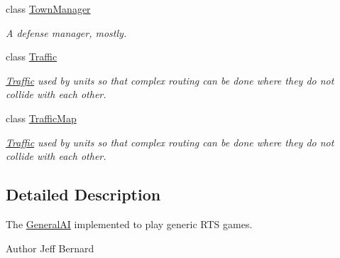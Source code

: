 \begin{DoxyCompactItemize}
class \hyperlink{classai_1_1general_1_1_town_manager}{TownManager}
\begin{DoxyCompactList}\small\item\em A defense manager, mostly. \end{DoxyCompactList}\item 
class \hyperlink{classai_1_1general_1_1_traffic}{Traffic}
\begin{DoxyCompactList}\small\item\em \hyperlink{classai_1_1general_1_1_traffic}{Traffic} used by units so that complex routing can be done where they do not collide with each other. \end{DoxyCompactList}\item 
class \hyperlink{classai_1_1general_1_1_traffic_map}{TrafficMap}
\begin{DoxyCompactList}\small\item\em \hyperlink{classai_1_1general_1_1_traffic}{Traffic} used by units so that complex routing can be done where they do not collide with each other. \end{DoxyCompactList}\end{DoxyCompactItemize}


\subsection{Detailed Description}
The \hyperlink{classai_1_1general_1_1_general_a_i}{GeneralAI} implemented to play generic RTS games. \begin{DoxyAuthor}{Author}
Jeff Bernard 
\end{DoxyAuthor}

